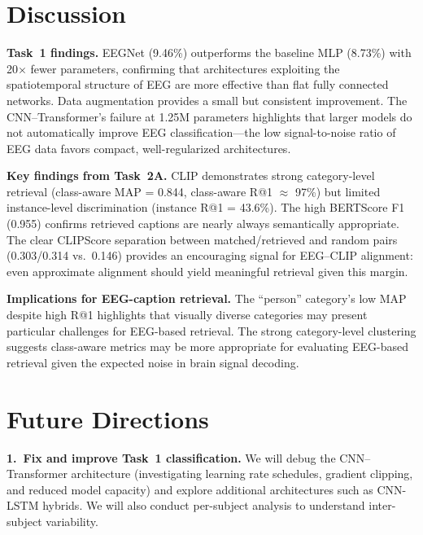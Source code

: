 \documentclass{article}
\begin{document}
\section{Discussion}
\label{sec:discussion}

\textbf{Task~1 findings.}
EEGNet (9.46\%) outperforms the baseline MLP (8.73\%) with 20$\times$ fewer parameters, confirming that architectures exploiting the spatiotemporal structure of EEG are more effective than flat fully connected networks. Data augmentation provides a small but consistent improvement. The CNN--Transformer's failure at 1.25M parameters highlights that larger models do not automatically improve EEG classification---the low signal-to-noise ratio of EEG data favors compact, well-regularized architectures.

\textbf{Key findings from Task~2A.}
CLIP demonstrates strong category-level retrieval (class-aware MAP = 0.844, class-aware R@1 $\approx$ 97\%) but limited instance-level discrimination (instance R@1 = 43.6\%). The high BERTScore F1 (0.955) confirms retrieved captions are nearly always semantically appropriate. The clear CLIPScore separation between matched/retrieved and random pairs (0.303/0.314 vs.\ 0.146) provides an encouraging signal for EEG--CLIP alignment: even approximate alignment should yield meaningful retrieval given this margin.

\textbf{Implications for EEG-caption retrieval.}
The ``person'' category's low MAP despite high R@1 highlights that visually diverse categories may present particular challenges for EEG-based retrieval. The strong category-level clustering suggests class-aware metrics may be more appropriate for evaluating EEG-based retrieval given the expected noise in brain signal decoding.

\section{Future Directions}
\label{sec:future}

\textbf{1.\ Fix and improve Task~1 classification.}
We will debug the CNN--Transformer architecture (investigating learning rate schedules, gradient clipping, and reduced model capacity) and explore additional architectures such as CNN-LSTM hybrids. We will also conduct per-subject analysis to understand inter-subject variability.
\end{document}
